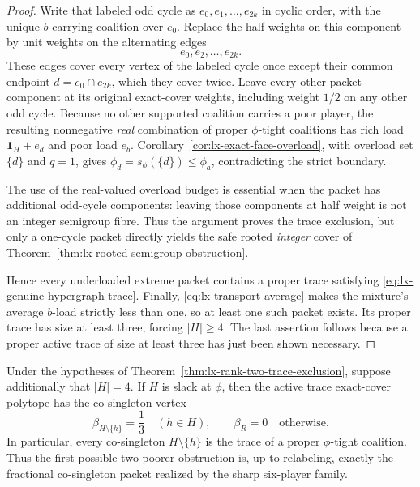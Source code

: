 \begin{proof}
Write that labeled odd cycle as
$e_0,e_1,\ldots,e_{2k}$ in cyclic order, with the unique $b$-carrying
coalition over $e_0$.  Replace the half weights on this component by unit
weights on the alternating edges
\[
 e_0,e_2,\ldots,e_{2k}.
\]
These edges cover every vertex of the labeled cycle once except their common
endpoint $d=e_0\cap e_{2k}$, which they cover twice.  Leave every other
packet component at its original exact-cover weights, including weight
$1/2$ on any other odd cycle.  Because no other supported coalition carries
a poor player, the resulting nonnegative \emph{real} combination of proper
$\phi$-tight coalitions has rich load $\mathbf1_H+e_d$ and poor load $e_b$.
Corollary~\ref{cor:lx-exact-face-overload}, with overload set $\{d\}$ and
$q=1$, gives $\phi_d=s_\phi(\{d\})\leq\phi_a$, contradicting the strict
boundary.

The use of the real-valued overload budget is essential when the packet has
additional odd-cycle components: leaving those components at half weight is
not an integer semigroup fibre.  Thus the argument proves the trace
exclusion, but only a one-cycle packet directly yields the safe rooted
\emph{integer} cover of Theorem~\ref{thm:lx-rooted-semigroup-obstruction}.

Hence every underloaded extreme packet contains a proper trace satisfying
\eqref{eq:lx-genuine-hypergraph-trace}.  Finally,
\eqref{eq:lx-transport-average} makes the mixture's average $b$-load strictly
less than one, so at least one such packet exists.  Its proper trace has size
at least three, forcing $|H|\geq4$.  The last assertion follows because a
proper active trace of size at least three has just been shown necessary.
\end{proof}

\begin{theorem}
\label{thm:lx-four-rich-trace-classification}
Under the hypotheses of
Theorem~\ref{thm:lx-rank-two-trace-exclusion}, suppose additionally that
$|H|=4$.  If $H$ is slack at $\phi$, then the active trace exact-cover
polytope has the co-singleton vertex
\[
 \beta_{H\setminus\{h\}}=\frac13\quad(h\in H),
 \qquad \beta_R=0\quad\text{otherwise}.             \tag{FO}
 \label{eq:lx-first-hypergraphic-obstruction}
\]
In particular, every co-singleton $H\setminus\{h\}$ is the trace of a proper
$\phi$-tight coalition.  Thus the first possible two-poorer obstruction is,
up to relabeling, exactly the fractional co-singleton packet realized by the
sharp six-player family.
\end{theorem}

